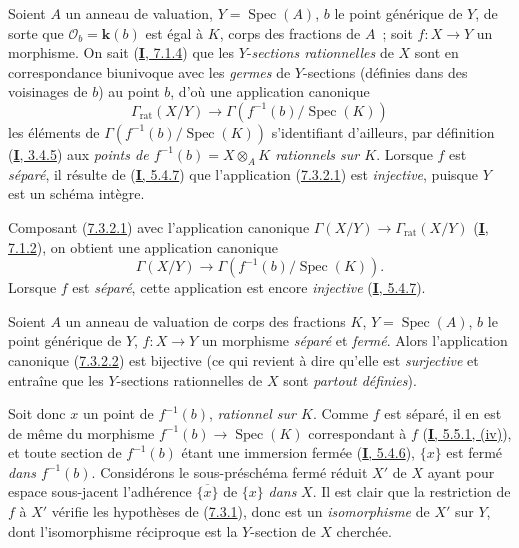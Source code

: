 \begin{env}[7.3.2]
\label{II.7.3.2-fr}
Soient $A$ un anneau de valuation, $Y=\operatorname{Spec}(A)$, $b$ le point
générique de $Y$, de sorte que $\mathcal{O}_b=\boldsymbol{k}(b)$ est égal à $K$, corps des
fractions de $A$~; soit $f:X\to Y$ un morphisme. On sait
(\hyperref[I.7.1.4-fr]{\textbf{I}, 7.1.4}) que les $Y$-\emph{sections rationnelles} de
$X$ sont en correspondance biunivoque avec les \emph{germes} de $Y$-sections
(définies dans des voisinages de $b$) au point $b$, d'où une application
canonique
\[
\tag{7.3.2.1}
\label{II.7.3.2.1-fr}
\Gamma_{\mathrm{rat}}(X/Y)\longrightarrow
\Gamma(f^{-1}(b)/\operatorname{Spec}(K))
\]
les éléments de $\Gamma(f^{-1}(b)/\operatorname{Spec}(K))$ s'identifiant
d'ailleurs, par définition (\hyperref[I.3.4.5-fr]{\textbf{I}, 3.4.5}) aux \emph{points
de $f^{-1}(b)=X\otimes_AK$ rationnels sur $K$}. Lorsque $f$ est \emph{séparé},
il résulte de (\hyperref[I.5.4.7-fr]{\textbf{I}, 5.4.7}) que l'application
(\hyperref[II.7.3.2.1-fr]{7.3.2.1}) est \emph{injective}, puisque $Y$ est un
schéma intègre.

Composant (\hyperref[II.7.3.2.1-fr]{7.3.2.1}) avec l'application canonique
$\Gamma(X/Y)\to\Gamma_{\mathrm{rat}}(X/Y)$
(\hyperref[I.7.1.2-fr]{\textbf{I}, 7.1.2}), on obtient une application canonique
\[
\tag{7.3.2.2}
\label{II.7.3.2.2-fr}
\Gamma(X/Y)\longrightarrow \Gamma(f^{-1}(b)/\operatorname{Spec}(K)).
\]
Lorsque $f$ est \emph{séparé}, cette application est encore \emph{injective}
(\hyperref[I.5.4.7-fr]{\textbf{I}, 5.4.7}).
\end{env}

\begin{proposition}[7.3.3]
\label{II.7.3.3-fr}
Soient $A$ un anneau de valuation de corps des fractions $K$,
$Y=\operatorname{Spec}(A)$, $b$ le point générique de $Y$, $f:X\to Y$ un
morphisme \emph{séparé} et \emph{fermé}. Alors l'application canonique
\textup{(\hyperref[II.7.3.2.2-fr]{7.3.2.2})} est bijective \textup{(ce qui revient à dire
qu'elle est \emph{surjective} et entraîne que les $Y$-sections rationnelles de
$X$ sont \emph{partout définies})}.
\end{proposition}

Soit donc $x$ un point de $f^{-1}(b)$, \emph{rationnel sur $K$}. Comme $f$ est
séparé, il en est de même du morphisme
$f^{-1}(b)\to\operatorname{Spec}(K)$ correspondant à $f$
(\hyperref[I.5.5.1-fr]{\textbf{I}, 5.5.1, (iv)}), et toute section de $f^{-1}(b)$ étant
une immersion fermée (\hyperref[I.5.4.6-fr]{\textbf{I}, 5.4.6}), $\{x\}$ est fermé
\emph{dans $f^{-1}(b)$}. Considérons le sous-préschéma fermé réduit $X'$ de
$X$ ayant pour espace sous-jacent l'adhérence $\overline{\{x\}}$ de $\{x\}$
\emph{dans} $X$. Il est clair que la restriction de $f$ à $X'$ vérifie les hypothèses
de (\hyperref[II.7.3.1-fr]{7.3.1}), donc est un \emph{isomorphisme} de $X'$ sur
$Y$, dont l'isomorphisme réciproque est la $Y$-section de $X$ cherchée.

